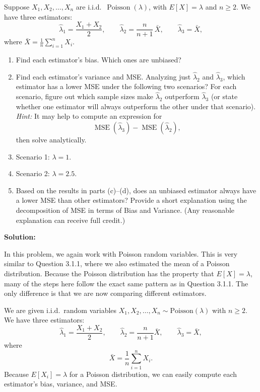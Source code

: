 \documentclass[11pt,letterpaper]{article}
\theoremstyle{remark}
\begin{document}
Suppose $X_1, X_2, \ldots, X_n$ are i.i.d.\ $\operatorname{Poisson}(\lambda)$, with $E[X] = \lambda$ and $n \ge 2$. We have three estimators:
\[
\hat{\lambda}_1 = \frac{X_1 + X_2}{2}, \qquad
\hat{\lambda}_2 = \frac{n}{n+1}\,\bar{X}, \qquad
\hat{\lambda}_3 = \bar{X},
\]
where $\bar{X} = \frac{1}{n}\sum_{i=1}^n X_i$.

\begin{enumerate}
    \item[(a)] Find each estimator's bias. Which ones are unbiased?

    \item[(b)] Find each estimator's variance and MSE. Analyzing just $\hat{\lambda}_2$ and $\hat{\lambda}_3$, which estimator has a lower MSE under the following two scenarios? For each scenario, figure out which sample sizes make $\hat{\lambda}_2$ outperform $\hat{\lambda}_3$ (or state whether one estimator will always outperform the other under that scenario). \emph{Hint:} It may help to compute an expression for
    \[
    \operatorname{MSE}(\hat{\lambda}_3) - \operatorname{MSE}(\hat{\lambda}_2),
    \]
    then solve analytically.

    \item[(c)] Scenario 1: $\lambda = 1$.

    \item[(d)] Scenario 2: $\lambda = 2.5$.

    \item[(e)] Based on the results in parts (c)--(d), does an unbiased estimator always have a lower MSE than other estimators? Provide a short explanation using the decomposition of MSE in terms of Bias and Variance. (Any reasonable explanation can receive full credit.)
\end{enumerate}

\vspace{1cm}

\textbf{Solution:}

In this problem, we again work with Poisson random variables. This is very similar to Question 3.1.1, where we also estimated the mean of a Poisson distribution. Because the Poisson distribution has the property that $E[X] = \lambda$, many of the steps here follow the exact same pattern as in Question 3.1.1. The only difference is that we are now comparing different estimators.

We are given i.i.d.\ random variables $X_1, X_2, \dots, X_n \sim \text{Poisson}(\lambda)$ with $n \ge 2$. We have three estimators:
\[
\hat{\lambda}_1 = \frac{X_1 + X_2}{2}, \qquad
\hat{\lambda}_2 = \frac{n}{n+1}\bar{X}, \qquad
\hat{\lambda}_3 = \bar{X},
\]
where
\[
\bar{X} = \frac{1}{n}\sum_{i=1}^n X_i.
\]
Because $E[X_i] = \lambda$ for a Poisson distribution, we can easily compute each estimator's bias, variance, and MSE.
\end{document}
